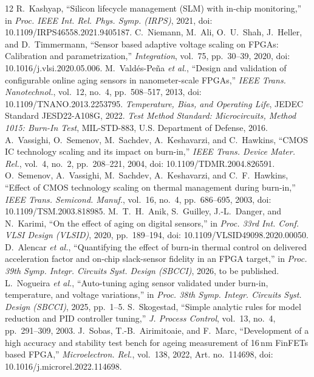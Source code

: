 \documentclass[10pt,twocolumn]{article}
\begin{document}
\renewcommand{\refname}{References}\begin{thebibliography}{12}
\footnotesize
 R.~Kashyap, ``Silicon lifecycle management (SLM) with in-chip monitoring,'' in \emph{Proc. IEEE Int. Rel. Phys. Symp. (IRPS)}, 2021, doi: 10.1109/IRPS46558.2021.9405187.
 C.~Niemann, M.~Ali, O.~U.~Shah, J.~Heller, and D.~Timmermann, ``Sensor based adaptive voltage scaling on FPGAs: Calibration and parametrization,'' \emph{Integration}, vol.~75, pp.~30--39, 2020, doi: 10.1016/j.vlsi.2020.05.006.
 M.~Vald\'es-Pe\~na \emph{et al.}, ``Design and validation of configurable online aging sensors in nanometer-scale FPGAs,'' \emph{IEEE Trans. Nanotechnol.}, vol.~12, no.~4, pp.~508--517, 2013, doi: 10.1109/TNANO.2013.2253795.
 \emph{Temperature, Bias, and Operating Life}, JEDEC Standard JESD22-A108G, 2022.
 \emph{Test Method Standard: Microcircuits, Method 1015: Burn-In Test}, MIL-STD-883, U.S. Department of Defense, 2016.
 A.~Vassighi, O.~Semenov, M.~Sachdev, A.~Keshavarzi, and C.~Hawkins, ``CMOS IC technology scaling and its impact on burn-in,'' \emph{IEEE Trans. Device Mater. Rel.}, vol.~4, no.~2, pp.~208--221, 2004, doi: 10.1109/TDMR.2004.826591.
 O.~Semenov, A.~Vassighi, M.~Sachdev, A.~Keshavarzi, and C.~F.~Hawkins, ``Effect of CMOS technology scaling on thermal management during burn-in,'' \emph{IEEE Trans. Semicond. Manuf.}, vol.~16, no.~4, pp.~686--695, 2003, doi: 10.1109/TSM.2003.818985.
 M.~T.~H.~Anik, S.~Guilley, J.-L.~Danger, and N.~Karimi, ``On the effect of aging on digital sensors,'' in \emph{Proc. 33rd Int. Conf. VLSI Design (VLSID)}, 2020, pp.~189--194, doi: 10.1109/VLSID49098.2020.00050.
 D.~Alencar \emph{et al.}, ``Quantifying the effect of burn-in thermal control on delivered acceleration factor and on-chip slack-sensor fidelity in an FPGA target,'' in \emph{Proc. 39th Symp. Integr. Circuits Syst. Design (SBCCI)}, 2026, to be published.
 L.~Nogueira \emph{et al.}, ``Auto-tuning aging sensor validated under burn-in, temperature, and voltage variations,'' in \emph{Proc. 38th Symp. Integr. Circuits Syst. Design (SBCCI)}, 2025, pp.~1--5.
 S.~Skogestad, ``Simple analytic rules for model reduction and PID controller tuning,'' \emph{J. Process Control}, vol.~13, no.~4, pp.~291--309, 2003.
 J.~Sobas, T.-B.~Airimitoaie, and F.~Marc, ``Development of a high accuracy and stability test bench for ageing measurement of 16\,nm FinFETs based FPGA,'' \emph{Microelectron. Rel.}, vol.~138, 2022, Art. no.~114698, doi: 10.1016/j.microrel.2022.114698.
\end{thebibliography}
\end{document}
